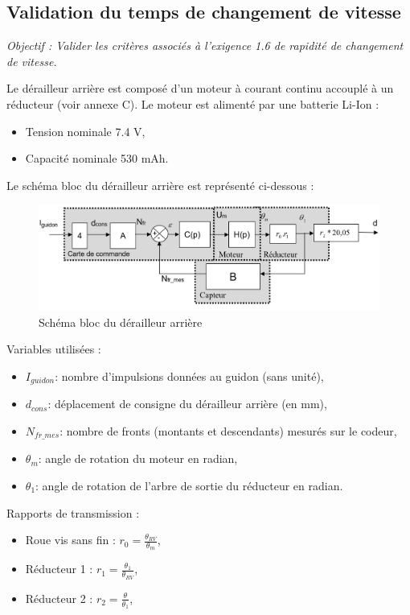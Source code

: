 \subsection{Validation du temps de changement de vitesse}

\textit{Objectif : Valider les critères associés à l'exigence 1.6 de rapidité de changement de vitesse.}

Le dérailleur arrière est composé d'un moteur à courant continu accouplé à un réducteur (voir annexe C). Le moteur est alimenté par une batterie Li-Ion :
\begin{itemize}
 \item Tension nominale 7.4 V,
 \item Capacité nominale 530 mAh.
\end{itemize}

Le schéma bloc du dérailleur arrière est représenté ci-dessous :
\begin{figure}[!h]
 \centering\includegraphics[width=0.8\linewidth]{img/img09}
 \caption{Schéma bloc du dérailleur arrière}
 \label{img09}
\end{figure}

Variables utilisées :
\begin{itemize}
 \item $I_{guidon}$: nombre d'impulsions données au guidon (sans unité),
 \item $d_{cons}$: déplacement de consigne du dérailleur arrière (en mm),
 \item $N_{fr\_mes}$: nombre de fronts (montants et descendants) mesurés sur le codeur,
 \item $\theta_{m}$: angle de rotation du moteur en radian,
 \item $\theta_1$: angle de rotation de l'arbre de sortie du réducteur en radian.

\end{itemize}

Rapports de transmission :
\begin{itemize}
 \item Roue vis sans fin : $r_0=\frac{\theta_{RV}}{\theta_{m}}$,
 \item Réducteur 1 : $r_1=\frac{\theta_{1}}{\theta_{RV}}$,
 \item Réducteur 2 : $r_2=\frac{\theta}{\theta_{1}}$,
\end{itemize}

